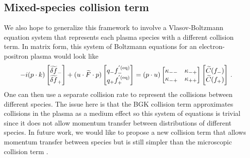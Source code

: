 \subsection{Mixed-species collision term}
We also hope to generalize this framework to involve a Vlasov-Boltzmann equation system that represents each plasma species with a different collision term. In matrix form, this system of Boltzmann equations for an electron-positron plasma would look like
\begin{equation}\label{eq:vectoreq}
-i (p \cdot k) \left[\begin{matrix}
\widetilde{\delta f}_- \\ \widetilde{\delta f}_+ 
\end{matrix}\right] + (u \cdot \widetilde{F} \cdot p)\left[\begin{matrix}
q_-f^{'(\mathrm{eq})}_- \\ q_+f^{'(\mathrm{eq})}_+
\end{matrix}\right] = (p \cdot u) \left[\begin{matrix}
\kappa_{--} & \kappa_{-+}\\
\kappa_{-+} & \kappa_{++}
\end{matrix}\right]\left[\begin{matrix}
\widetilde{C}(f_-) \\ \widetilde{C}(f_+)
\end{matrix} \right]\,.
\end{equation}
One can then use a separate collision rate to represent the collisions between different species. The issue here is that the BGK collision term approximates collisions in the plasma as a medium effect so this system of equations is trivial since it does not allow momentum transfer between distributions of different species. In future work, we would like to propose a new collision term that allows momentum transfer between species but is still simpler than the microscopic collision term .








